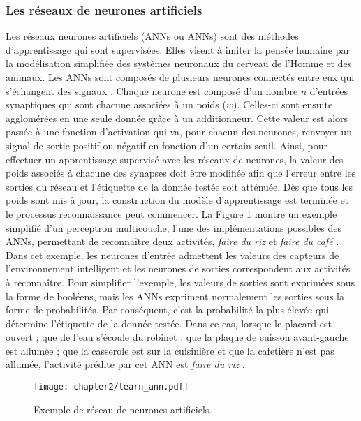 \subsubsection{Les réseaux de neurones artificiels}

Les réseaux neurones artificiels (\aclp{ANN} ou \acsp{ANN}) sont des méthodes d'apprentissage qui sont supervisées. Elles visent à imiter la pensée humaine par la modélisation simplifiée des systèmes neuronaux du cerveau de l'Homme et des animaux. Les \acsp{ANN} sont composés de plusieurs neurones connectés entre eux qui s'échangent des signaux \citep{Witten2016}. Chaque neurone est composé d'un nombre $n$ d'entrées synaptiques qui sont chacune associées à un poids ($w$). Celles-ci sont ensuite agglomérées en une seule donnée grâce à un additionneur. Cette valeur est alors passée à une fonction d'activation qui va, pour chacun des neurones, renvoyer un signal de sortie positif ou négatif en fonction d'un certain seuil. Ainsi, pour effectuer un apprentissage supervisé avec les réseaux de neurones, la valeur des poids associés à chacune des synapses doit être modifiée afin que l'erreur entre les sorties du réseau et l'étiquette de la donnée testée soit atténuée. Dès que tous les poids sont mis à jour, la construction du modèle d'apprentissage est terminée et le processus reconnaissance peut commencer. La Figure \ref{fig:learn_ann} montre un exemple simplifié d'un perceptron multicouche, l'une des implémentations possibles des \acsp{ANN}, permettant de reconnaître deux activités, \og \textit{faire du riz} \fg et \og \textit{faire du café} \fg. Dans cet exemple, les neurones d'entrée admettent les valeurs des capteurs de l'environnement intelligent et les neurones de sorties correspondent aux activités à reconnaître. Pour simplifier l'exemple, les valeurs de sorties sont exprimées sous la forme de booléens, mais les \acsp{ANN} expriment normalement les sorties sous la forme de probabilités. Par conséquent, c'est la probabilité la plus élevée qui détermine l'étiquette de la donnée testée. Dans ce cas, lorsque le placard est ouvert ; que de l'eau s'écoule du robinet ; que la plaque de cuisson avant-gauche est allumée ; que la casserole est sur la cuisinière et que la cafetière n'est pas allumée, l'activité prédite par cet \acs{ANN} est \og \textit{faire du riz} \fg.

\begin{figure}[H]
	\centering
	\texttt{[image: chapter2/learn\_ann.pdf]}
	\caption{Exemple de réseau de neurones artificiels.}
	\label{fig:learn_ann}
\end{figure}

